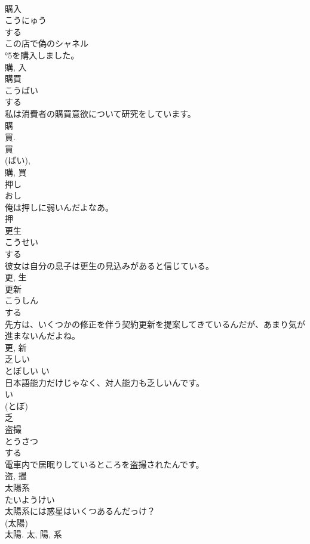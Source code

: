 \documentclass[8pt]{extreport}
\begin{document}
\begin{CJK}{UTF8}{min}
\\	購入	
\\	こうにゅう	
\\	する 
\\	この店で偽のシャネル
\\	°5を購入しました。	
\\	購, 入	
\\	購買	
\\	こうばい	
\\	する 
\\	私は消費者の購買意欲について研究をしています。	
\\	購 
\\	買. 
\\	買 
\\	(ばい), 
\\	購, 買	
\\	押し	
\\	おし	
\\	俺は押しに弱いんだよなあ。	
\\	押	
\\	更生	
\\	こうせい	
\\	する 
\\	彼女は自分の息子は更生の見込みがあると信じている。	
\\	更, 生	
\\	更新	
\\	こうしん	
\\	する 
\\	先方は、いくつかの修正を伴う契約更新を提案してきているんだが、あまり気が進まないんだよね。	
\\	更, 新	
\\	乏しい	
\\	とぼしい	い 
\\	日本語能力だけじゃなく、対人能力も乏しいんです。	
\\	い 
\\	(とぼ) 
\\	乏	
\\	盗撮	
\\	とうさつ	
\\	する 
\\	電車内で居眠りしているところを盗撮されたんです。	
\\	盗, 撮	
\\	太陽系	
\\	たいようけい	
\\	太陽系には惑星はいくつあるんだっけ？	
\\	(太陽) 
\\	太陽.	太, 陽, 系	

\end{CJK}
\end{document}
